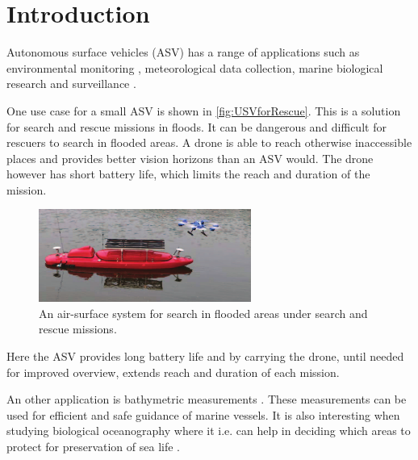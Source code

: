 \chapter{Introduction}

Autonomous surface vehicles (ASV) has a range of applications such as environmental monitoring \cite[p. 745]{MAHsieh}, meteorological data collection, marine biological research and surveillance \cite[p. 8-10]{FFahimi}.

One use case for a small ASV is shown in \autoref{fig:USVforRescue}. This is a solution for search and rescue missions in floods. It can be dangerous and difficult for rescuers to search in flooded areas. A drone is able to reach otherwise inaccessible places and provides better vision horizons than an ASV would. The drone however has short battery life, which limits the reach and duration of the mission.
%
\begin{figure}[H]
  \vspace{3mm}
  \includegraphics[width=0.62\textwidth]{figures/USVforRescue.pdf}
  \caption{An air-surface system for search in flooded areas under search and rescue missions.\cite{JZhang}}
  \label{fig:USVforRescue}
\end{figure}
\vspace{-6mm}
%
Here the ASV provides long battery life and by carrying the drone, until needed for improved overview, extends reach and duration of each mission.\cite{JZhang}

An other application is bathymetric measurements \cite{MBibuli}. These measurements can be used for efficient and safe guidance of marine vessels. It is also interesting when studying biological oceanography where it i.e. can help in deciding which areas to protect for preservation of sea life \cite{NOService}.

